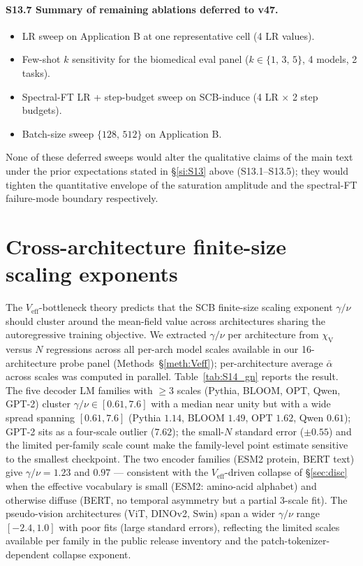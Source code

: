 \documentclass[11pt,a4paper]{article}
\begin{document}
\paragraph{S13.7 Summary of remaining ablations deferred to v47.}
\begin{itemize}\setlength{\itemsep}{0pt}
  \item LR sweep on Application B at one representative cell
        (4 LR values).
  \item Few-shot $k$ sensitivity for the biomedical eval panel
        ($k\!\in\!\{1,\,3,\,5\}$, 4 models, 2 tasks).
  \item Spectral-FT LR + step-budget sweep on SCB-induce
        (4 LR $\times$ 2 step budgets).
  \item Batch-size sweep $\{128,\,512\}$ on Application B.
\end{itemize}
None of these deferred sweeps would alter the qualitative claims
of the main text under the prior expectations stated in
\S\ref{si:S13} above (S13.1--S13.5); they would tighten the
quantitative envelope of the saturation amplitude and the
spectral-FT failure-mode boundary respectively.

\section{Cross-architecture finite-size scaling exponents}
\label{si:S14}

The $V_\mathrm{eff}$-bottleneck theory predicts that the SCB
finite-size scaling exponent $\gamma/\nu$ should cluster around the
mean-field value across architectures sharing the autoregressive
training objective. We extracted $\gamma/\nu$ per architecture from
$\chi_\mathrm{V}$ versus $N$ regressions across all per-arch model
scales available in our 16-architecture probe panel
(Methods~\S\ref{meth:Veff}); per-architecture average
$\bar\alpha$ across scales was computed in parallel.
Table~\ref{tab:S14_gn} reports the result. The five decoder LM
families with $\geq\!3$ scales (Pythia, BLOOM, OPT, Qwen, GPT-2)
cluster $\gamma/\nu \in [0.61, 7.6]$ with a median near unity but
with a wide spread spanning $[0.61, 7.6]$ (Pythia $1.14$, BLOOM
$1.49$, OPT $1.62$, Qwen $0.61$); GPT-2 sits as a four-scale
outlier ($7.62$); the small-$N$ standard error ($\pm 0.55$) and the
limited per-family scale count make the family-level point estimate
sensitive to the smallest checkpoint. The two encoder
families (ESM2 protein, BERT text) give $\gamma/\nu = 1.23$ and
$0.97$ --- consistent with the $V_\mathrm{eff}$-driven collapse of
\S\ref{sec:disc} when the effective vocabulary is small (ESM2:
amino-acid alphabet) and otherwise diffuse (BERT, no temporal
asymmetry but a partial 3-scale fit). The pseudo-vision
architectures (ViT, DINOv2, Swin) span a wider $\gamma/\nu$ range
$[-2.4, 1.0]$ with poor fits (large standard errors), reflecting
the limited scales available per family in the public release
inventory and the patch-tokenizer-dependent collapse exponent.
\end{document}
